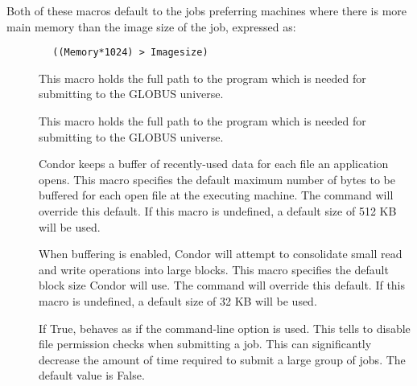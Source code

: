 Both of these macros default to the jobs preferring machines where
there is more main memory than the image size of the job, expressed
as:
\begin{verbatim}
        ((Memory*1024) > Imagesize)
\end{verbatim}

\begin{description}
\item[] \label{param:Globusrun}
  This macro holds the full path to the  program which is
  needed for submitting to the GLOBUS universe.
\end{description}

\begin{description}
\item[] \label{param:GlobusShadow}
  This macro holds the full path to the  program 
  which is needed for submitting to the GLOBUS universe.
\end{description}

\begin{description}
\item[] \label{param:DefaultBufferSize}
  Condor keeps a buffer of recently-used data for each file an
  application opens.  This macro specifies the default maximum number
  of bytes to be buffered for each open file at the executing machine.
  The   command will override this
  default.  If this macro is undefined, a default size of 512 KB will
  be used.

\item[] 
  \label{param:DefaultBufferBlockSize} When buffering is enabled,
  Condor will attempt to consolidate small read and write operations
  into large blocks.  This macro specifies the default block size
  Condor will use.  The  
  command will override this default.  If this macro is undefined, a
  default size of 32 KB will be used.

\item[] \label{param:SubmitSkipFilecheck}
  If True,  behaves as if the  
  command-line option is used.
  This tells  to disable file permission checks when
  submitting a job.
  This can significantly decrease the amount of time required to submit
  a large group of jobs.
  The default value is False.
\end{description}

